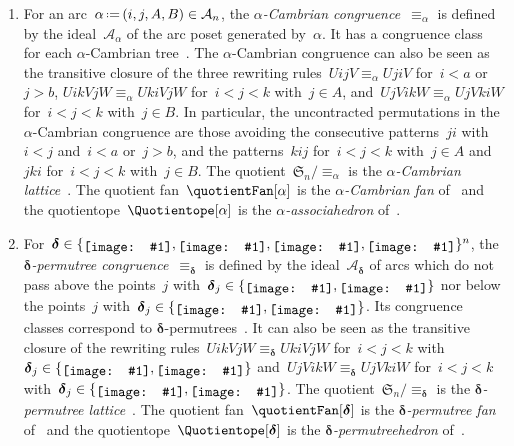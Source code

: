 \documentclass{amsart}
\theoremstyle{definition}
\newcommand{\f}[1]{{\mathfrak{#1}}} %
\renewcommand{\b}[1]{{\boldsymbol{#1}}} %
\newcommand{\eqdef}{\mbox{\,\raisebox{0.2ex}{\scriptsize\ensuremath{\mathrm:}}\ensuremath{=}\,}} %
\newcommand{\darkblue}{\color{darkblue}} %
\newcommand{\defn}[1]{\textsl{\darkblue #1}} %
\newcommand{\arc}{\alpha} %
\newcommand{\arcs}{{\mathcal{A}}} %
\newcommand{\decoration}{{\b{\delta}}} %
\newcommand{\includeSymbol}[1]{\ensuremath{%
	\mathchoice
		{\raisebox{-.7mm}{\texttt{[image: \#1]}}}	
		{\raisebox{-.7mm}{\texttt{[image: \#1]}}}
		{\raisebox{-.6mm}{\texttt{[image: \#1]}}}
		{\raisebox{-.5mm}{\texttt{[image: \#1]}}}
}}
\newcommand{\noneCirc}{\includeSymbol{none}}
\newcommand{\upCirc}{\includeSymbol{up}}
\newcommand{\downCirc}{\includeSymbol{down}}
\newcommand{\upDownCirc}{\includeSymbol{updown}}
\newcommand{\Decorations}{\{\noneCirc{}, \downCirc{}, \upCirc{}, \upDownCirc{}\}} %
\begin{document}
\begin{enumerate}
\item \label{item:CambrianCongruence}
For an arc~$\arc \eqdef (i, j, A, B) \in \arcs_n$, the \defn{$\arc$-Cambrian congruence}~$\equiv_\arc$ is defined by the ideal~$\arcs_\arc$ of the arc poset generated by~$\arc$.
It has a congruence class for each  $\arc$-Cambrian tree~\cite{LangePilaud, ChatelPilaud, PilaudPons-permutrees}.
The $\arc$-Cambrian congruence can also be seen as the transitive closure of the three rewriting rules~${U i j V \equiv_\arc U j i V}$ for~$i < a$ or~$j > b$, $U i k V j W \equiv_\arc U k i V j W$ for~$i < j < k$ with~$j \in A$, and~$U j V i k W \equiv_\arc U j V k i W$ for~$i < j < k$ with~$j \in B$.
In particular, the uncontracted permutations in the $\arc$-Cambrian congruence are those avoiding the consecutive patterns~$ji$ with~$i < j$ and~$i < a$ or~$j > b$, and the patterns~$kij$ for~$i < j < k$ with~$j \in A$ and~$jki$ for~$i < j < k$ with~$j \in B$.
The quotient~$\f{S}_n / {\equiv_\arc}$ is the \defn{$\arc$-Cambrian lattice}~\cite{Reading-CambrianLattices}.
The quotient fan~$\quotientFan[\arc]$ is the \defn{$\arc$-Cambrian fan} of~\cite{ReadingSpeyer} and the quotientope~$\Quotientope[\arc]$ is the \defn{$\arc$-associahedron} of~\cite{HohlwegLange}.

\item \label{item:permutreeCongruence}
For~$\decoration \in \Decorations^n$, the \defn{$\decoration$-permutree congruence}~$\equiv_\decoration$ is defined by the ideal~$\arcs_\decoration$ of arcs which do not pass above the points~$j$ with~$\decoration_j \in \{\upCirc, \upDownCirc\}$ nor below the points~$j$ with~$\decoration_j \in \{\downCirc, \upDownCirc\}$.
Its congruence classes correspond to $\decoration$-permutrees~\cite{PilaudPons-permutrees}.
It can also be seen as the transitive closure of the rewriting rules~$U i k V j W \equiv_\decoration U k i V j W$ for~$i < j < k$ with~$\decoration_j \in \{\downCirc, \upDownCirc\}$ and~$U j V i k W \equiv_\decoration U j V k i W$ for~$i < j < k$ with~$\decoration_j \in \{\upCirc, \upDownCirc\}$.
The quotient~$\f{S}_n / {\equiv_\decoration}$ is the \defn{$\decoration$-permutree lattice}~\cite{PilaudPons-permutrees}.
The quotient fan~$\quotientFan[\decoration]$ is the \defn{$\decoration$-permutree fan} of~\cite{PilaudPons-permutrees} and the quotientope~$\Quotientope[\decoration]$ is the \defn{$\decoration$-permutreehedron} of~\cite{PilaudPons-permutrees}.


\end{enumerate}
\end{document}
